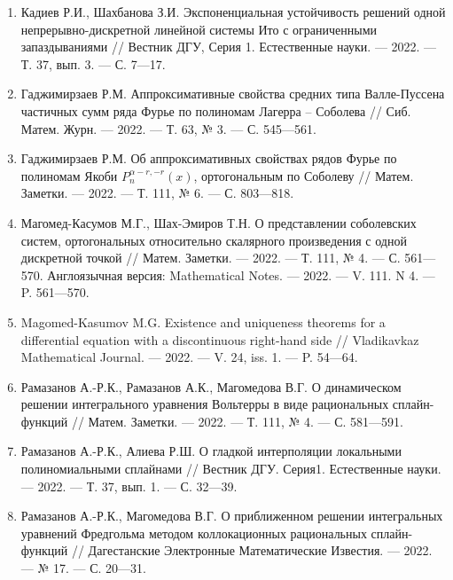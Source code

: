 \begin{enumerate}[1]
    \item
    Кадиев Р.И., Шахбанова З.И.
    Экспоненциальная устойчивость решений одной непрерывно-дискретной линейной системы Ито с ограниченными запаздываниями
    //
    Вестник ДГУ, Серия 1. Естественные науки.
    --- 2022.
    --- Т. 37, вып. 3.
    --- С. 7---17.



    \item
    Гаджимирзаев Р.М.
    Аппроксимативные свойства средних типа Валле-Пуссена частичных сумм ряда Фурье по полиномам Лагерра – Соболева
    //
    Сиб. Матем. Журн.
    --- 2022.
    --- Т. 63, № 3.
    --- С. 545---561.

    \item
    Гаджимирзаев Р.М.
    Об аппроксимативных свойствах рядов Фурье по полиномам Якоби $P_n^{\alpha - r,-r}(x)$, ортогональным по Соболеву
    //
    Матем. Заметки.
    --- 2022.
    --- Т. 111, № 6.
    --- С. 803---818.



    \item
    Магомед-Касумов М.Г., Шах-Эмиров Т.Н.
    О представлении соболевских систем, ортогональных относительно скалярного произведения с одной дискретной точкой
    //
    Матем. Заметки.
    --- 2022.
    --- Т. 111, № 4.
    --- С. 561---570.
    Англоязычная версия:
    Mathematical Notes.
    --- 2022.
    --- V. 111.  N 4.
    --- P. 561---570.

    \item
    Magomed-Kasumov M.G.
    Existence and uniqueness theorems for a differential equation with a discontinuous right-hand side
    //
    Vladikavkaz Mathematical Journal.
    --- 2022.
    --- V. 24, iss. 1.
    --- P. 54---64.



    \item
    Рамазанов А.-Р.К., Рамазанов А.К., Магомедова В.Г.
    О динамическом решении интегрального уравнения Вольтерры в виде рациональных сплайн-функций
    //
    Матем. Заметки.
    --- 2022.
    --- Т. 111, № 4.
    --- С. 581---591.

    \item
    Рамазанов А.-Р.К., Алиева Р.Ш.
    О гладкой интерполяции локальными полиномиальными сплайнами
    //
    Вестник ДГУ. Серия1. Естественные науки.
    --- 2022.
    --- Т. 37, вып. 1.
    --- С. 32---39.

    \item
    Рамазанов А.-Р.К., Магомедова В.Г.
    О приближенном решении интегральных уравнений Фредгольма методом коллокационных рациональных сплайн-функций
    //
    Дагестанские Электронные Математические Известия.
    --- 2022.
    --- № 17.
    --- С. 20---31.



\end{enumerate}
